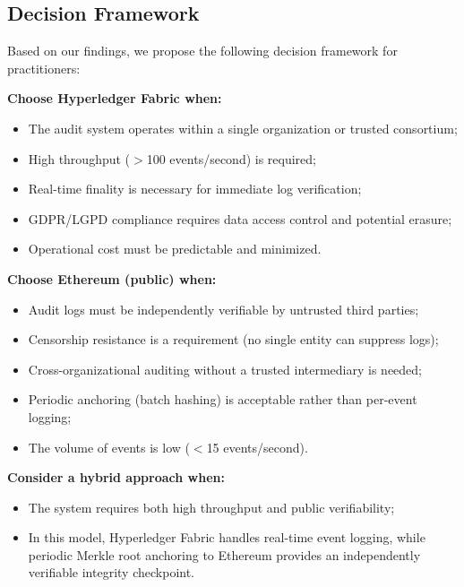 \documentclass[12pt,a4paper]{article}
\begin{document}
\subsection{Decision Framework}

Based on our findings, we propose the following decision framework for practitioners:

\textbf{Choose Hyperledger Fabric when:}
\begin{itemize}
    \item The audit system operates within a single organization or trusted consortium;
    \item High throughput ($>$100 events/second) is required;
    \item Real-time finality is necessary for immediate log verification;
    \item GDPR/LGPD compliance requires data access control and potential erasure;
    \item Operational cost must be predictable and minimized.
\end{itemize}

\textbf{Choose Ethereum (public) when:}
\begin{itemize}
    \item Audit logs must be independently verifiable by untrusted third parties;
    \item Censorship resistance is a requirement (no single entity can suppress logs);
    \item Cross-organizational auditing without a trusted intermediary is needed;
    \item Periodic anchoring (batch hashing) is acceptable rather than per-event logging;
    \item The volume of events is low ($<$15 events/second).
\end{itemize}

\textbf{Consider a hybrid approach when:}
\begin{itemize}
    \item The system requires both high throughput and public verifiability;
    \item In this model, Hyperledger Fabric handles real-time event logging, while periodic Merkle root anchoring to Ethereum provides an independently verifiable integrity checkpoint.
\end{itemize}

\end{document}
